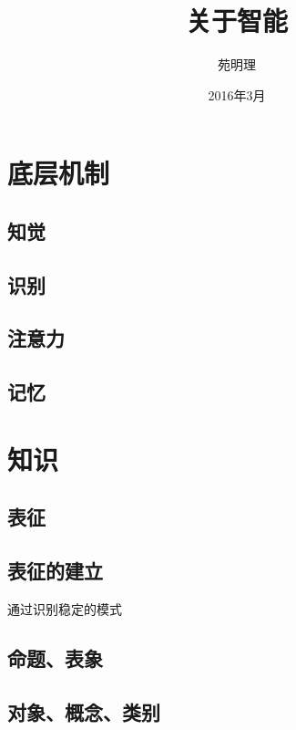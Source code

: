 \documentclass[a4paper,12pt]{article}
\title{关于智能}
\author{苑明理}
\date{2016年3月}
\begin{document}
\maketitle{}

\renewcommand\contentsname{目录}
\setcounter{tocdepth}{2}
\tableofcontents

\newpage

\section{底层机制}

\subsection{知觉}

\subsection{识别}

\subsection{注意力}

\subsection{记忆}

\section{知识}

\subsection{表征}

\subsection{表征的建立}

通过识别稳定的模式

\subsection{命题、表象}

\subsection{对象、概念、类别}
\end{document}

